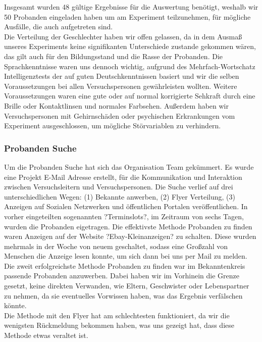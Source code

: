\documentclass{Bericht}
\begin{document}
Insgesamt wurden 48 gültige Ergebnisse für die Auswertung benötigt, weshalb wir 50 Probanden eingeladen haben um am Experiment teilzunehmen, für mögliche Ausfälle, die auch aufgetreten sind. \\

Die Verteilung der Geschlechter haben wir offen gelassen, da in dem Ausmaß unseres Experiments keine signifikanten Unterschiede zustande gekommen wären, das gilt auch für den Bildungsstand und die Rasse der Probanden. Die Sprachkenntnisse waren uns dennoch wichtig, aufgrund des Mehrfach-Wortschatz Intelligenztests der auf guten Deutschkenntnissen basiert und wir die selben Voraussetzungen bei allen Versuchspersonen gewährleisten wollten. Weitere Voraussetzungen waren eine gute oder auf normal korrigierte Sehkraft durch eine Brille oder Kontaktlinsen und normales Farbsehen. Außerdem haben wir Versuchspersonen mit Gehirnschäden oder psychischen Erkrankungen vom Experiment ausgeschlossen, um mögliche Störvariablen zu verhindern. 


\subsubsection{Probanden Suche} 

Um die Probanden Suche hat sich das Organisation Team gekümmert. Es wurde eine Projekt E-Mail Adresse erstellt, für die Kommunikation und Interaktion zwischen Versuchsleitern und Versuchspersonen. Die Suche verlief auf drei unterschiedlichen Wegen: (1) Bekannte anwerben, (2) Flyer Verteilung, (3) Anzeigen auf Sozialen Netzwerken und öffentlichen Portalen veröffentlichen. In vorher eingeteilten sogenannten ?Terminslots?, im Zeitraum von sechs Tagen, wurden die Probanden eigetragen. Die effektivste Methode Probanden zu finden waren Anzeigen auf der Website ?Ebay-Kleinanzeigen? zu schalten. Diese wurden mehrmals in der Woche von neuem geschaltet, sodass eine Großzahl von Menschen die Anzeige lesen konnte, um sich dann bei uns per Mail zu melden. \\

Die zweit erfolgreichste Methode Probanden zu finden war im Bekanntenkreis passende Probanden anzuwerben. Dabei haben wir im Vorhinein die Grenze gesetzt, keine direkten Verwanden, wie Eltern, Geschwister oder Lebenspartner zu nehmen, da sie eventuelles Vorwissen haben, was das Ergebnis verfälschen könnte. \\

Die Methode mit den Flyer hat am schlechtesten funktioniert, da wir die wenigsten Rückmeldung bekommen haben, was uns gezeigt hat, dass diese Methode etwas veraltet ist.
\end{document}
